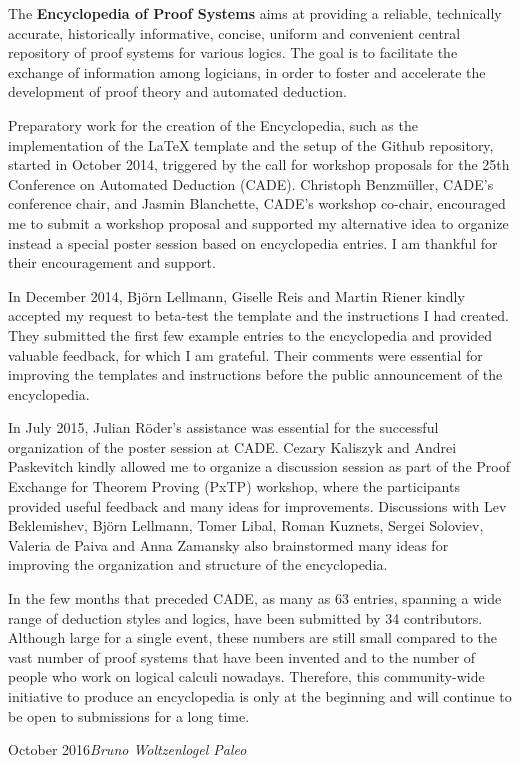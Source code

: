 
\preface

The \textbf{Encyclopedia of Proof Systems} aims at providing a reliable, technically accurate, historically informative, concise, uniform and convenient central repository of proof systems for various logics. The goal is to facilitate the exchange of information among logicians, in order to foster and accelerate the development of proof theory and automated deduction.

Preparatory work for the creation of the Encyclopedia, such as the implementation of the LaTeX template and the setup of the Github repository, started in October 2014, triggered by the call for workshop proposals for the 25th Conference on Automated Deduction (CADE). Christoph Benzm\"uller, CADE's conference chair, and Jasmin Blanchette, CADE's workshop co-chair, encouraged me to submit a workshop proposal and supported my alternative idea to organize instead a special poster session based on encyclopedia entries. I am thankful for their encouragement and support.

In December 2014, Bj\"orn Lellmann, Giselle Reis and Martin Riener kindly accepted my request to beta-test the template and the instructions I had created. They submitted the first few example entries to the encyclopedia and provided valuable feedback, for which I am grateful. Their comments were essential for improving the templates and instructions before the public announcement of the encyclopedia.

In July 2015, Julian R\"oder's assistance was essential for the successful organization of the poster session at CADE. Cezary Kaliszyk and Andrei Paskevitch kindly allowed me to organize a discussion session as part of the Proof Exchange for Theorem Proving (PxTP) workshop, where the participants provided useful feedback and many ideas for improvements. Discussions with Lev Beklemishev, Bj\"orn Lellmann, Tomer Libal, Roman Kuznets, Sergei Soloviev, Valeria de Paiva and Anna Zamansky also brainstormed many ideas for improving the organization and structure of the encyclopedia.

In the few months that preceded CADE, as many as 63 entries, spanning a wide range of deduction styles and logics, have been submitted by 34 contributors. Although large for a single event, these numbers are still small compared to the vast number of proof systems that have been invented and to the number of people who work on logical calculi nowadays. Therefore, this community-wide initiative to produce an encyclopedia is only at the beginning and will continue to be open to submissions for a long time. 

\vspace{\baselineskip}
\begin{flushright}\noindent
October 2016\hfill {\it Bruno Woltzenlogel Paleo}
\end{flushright}


